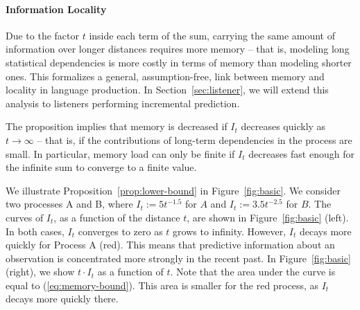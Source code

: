 \documentclass[11pt,letterpaper]{article}
\begin{document}
\paragraph{Information Locality}


Due to the factor $t$ inside each term of the sum, carrying the same amount of information over longer distances requires more memory -- that is, modeling long statistical dependencies is more costly in terms of memory than modeling shorter ones.
This formalizes a general, assumption-free, link between memory and locality in language production.
In Section~\ref{sec:listener}, we will extend this analysis to listeners performing incremental prediction.




The proposition implies that memory is decreased if $I_t$ decreases quickly as $t \rightarrow \infty$ -- that is, if the contributions of long-term dependencies in the process are small.
In particular, memory load can only be finite if $I_t$ decreases fast enough for the infinite sum to converge to a finite value.





We illustrate Proposition~\ref{prop:lower-bound} in Figure~\ref{fig:basic}.
We consider two processes A and B, where $I_t := 5t^{-1.5}$ for $A$ and $I_t := 3.5 t^{-2.5}$ for $B$.
The curves of $I_t$, as a function of the distance $t$, are shown in Figure~\ref{fig:basic} (left).
In both cases, $I_t$ converges to zero as $t$ grows to infinity. 
However, $I_t$ decays more quickly for Process A (red).
This means that predictive information about an observation is concentrated more strongly in the recent past.
In Figure~\ref{fig:basic} (right), we show $t\cdot I_t$ as a function of $t$.
Note that the area under the curve is equal to (\ref{eq:memory-bound}).
This area is smaller for the red process, as $I_t$ decays more quickly there.  
\end{document}
